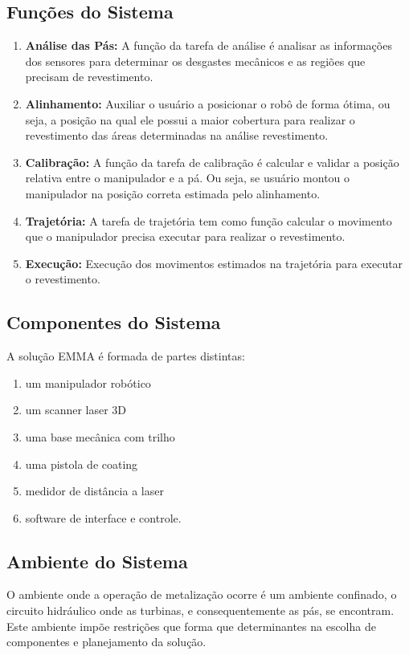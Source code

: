 \documentclass[12pt,a4paper]{article}
\begin{document}
\subsection{Funções do Sistema}
\begin {enumerate}
  \item \textbf{Análise das Pás:} A função da tarefa de análise é analisar as
  informações dos sensores para determinar os desgastes mecânicos e as regiões que precisam de revestimento.
  \item \textbf{Alinhamento:} Auxiliar o usuário a posicionar o robô de forma
  ótima, ou seja, a posição na qual ele possui a maior cobertura para realizar o revestimento das áreas determinadas na análise revestimento.
  \item \textbf {Calibração:} A função da tarefa de calibração é calcular e
  validar a posição relativa entre o manipulador e a pá. Ou seja, se usuário montou o manipulador na posição correta estimada pelo alinhamento.
  \item \textbf {Trajetória:} A tarefa de trajetória tem como função calcular o
  movimento que o manipulador precisa executar para realizar o revestimento.
  \item \textbf {Execução:} Execução dos movimentos estimados na trajetória para
  executar o revestimento.
\end{enumerate}

\subsection{Componentes do Sistema}
A solução EMMA é formada de partes distintas:
\begin {enumerate}
	\item um manipulador robótico
	\item um scanner laser 3D
	\item uma base mecânica com trilho
	\item uma pistola de coating
	\item medidor de distância a laser
	\item software de interface e controle.
\end {enumerate} 

\subsection {Ambiente do Sistema}
O ambiente onde a operação de metalização ocorre é um ambiente confinado, o circuito hidráulico onde as turbinas, e consequentemente as pás, se encontram. 
Este ambiente impõe restrições que forma que determinantes na escolha de componentes e planejamento da solução.
\end{document}
